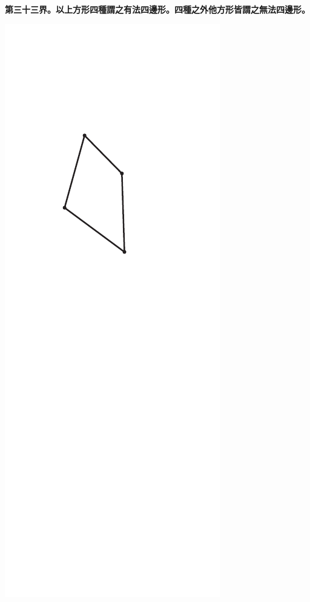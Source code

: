 \documentclass[12pt,b5paper,landscape]{article}
\newcommand{\cthm}[1]{{
\vspace{8pt}

\bfseries #1}}
\begin{document}
\begin{multicols}{2}
\cthm{第三十三界。以上方形四種謂之有法四邊形。四種之外他方形皆謂之無法四邊形。}
\begin{center}
\includegraphics[angle=90]{eu23}
\end{center}


\end{multicols}
\end{document}
